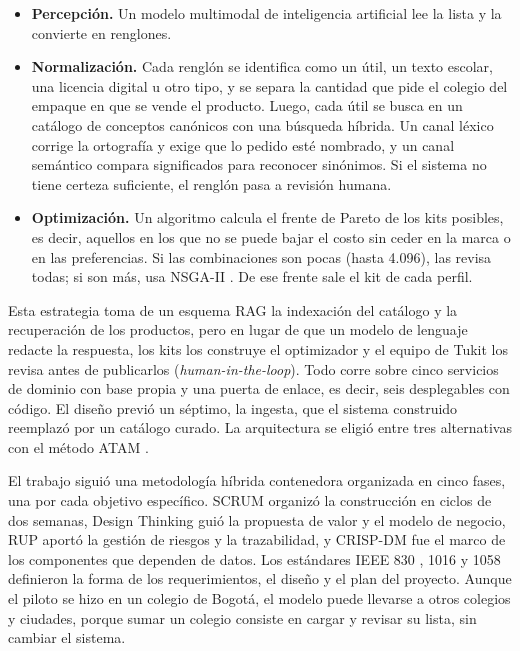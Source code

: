 \begin{itemize}
  \item \textbf{Percepción.} Un modelo multimodal de inteligencia artificial lee la lista y
        la convierte en renglones.
  \item \textbf{Normalización.} Cada renglón se identifica como un útil, un texto escolar,
        una licencia digital u otro tipo, y se separa la cantidad que pide el colegio del
        empaque en que se vende el producto. Luego, cada útil se busca en un catálogo de
        conceptos canónicos con una búsqueda híbrida. Un canal léxico corrige la ortografía
        y exige que lo pedido esté nombrado, y un canal semántico compara significados para
        reconocer sinónimos. Si el sistema no tiene certeza suficiente, el renglón pasa a
        revisión humana.
  \item \textbf{Optimización.} Un algoritmo calcula el frente de Pareto de los kits
        posibles, es decir, aquellos en los que no se puede bajar el costo sin ceder en la
        marca o en las preferencias. Si las combinaciones son pocas (hasta 4.096), las revisa
        todas; si son más, usa NSGA-II \citep{deb_fast_2002}. De ese frente sale el kit de
        cada perfil.
\end{itemize}

Esta estrategia toma de un esquema RAG la indexación del catálogo y la recuperación de los
productos, pero en lugar de que un modelo de lenguaje redacte la respuesta, los kits los
construye el optimizador y el equipo de Tukit los revisa antes de publicarlos
(\emph{human-in-the-loop}). Todo corre sobre cinco servicios de dominio con base propia y una
puerta de enlace, es decir, seis desplegables con código. El diseño previó un séptimo, la ingesta,
que el sistema construido reemplazó por un catálogo curado. La arquitectura se eligió entre tres
alternativas con el método ATAM \citep{bass_software_2021}.\par

El trabajo siguió una metodología híbrida contenedora organizada en cinco fases, una por cada
objetivo específico. SCRUM \citep{schwaber_scrum_2020} organizó la construcción en ciclos de
dos semanas, Design Thinking \citep{brown_design_2008} guió la propuesta de valor y el modelo
de negocio, RUP \citep{kruchten_rup_2003} aportó la gestión de riesgos y la trazabilidad, y
CRISP-DM \citep{chapman_crisp-dm_2000} fue el marco de los componentes que dependen de datos.
Los estándares IEEE 830 \citep{ieee_830_1998}, 1016 \citep{ieee_1016_2009} y 1058
\citep{ieee_1058_1998} definieron la forma de los requerimientos, el diseño y el plan del
proyecto. Aunque el piloto se hizo en un colegio de Bogotá, el modelo puede llevarse a otros
colegios y ciudades, porque sumar un colegio consiste en cargar y revisar su lista, sin
cambiar el sistema.\par